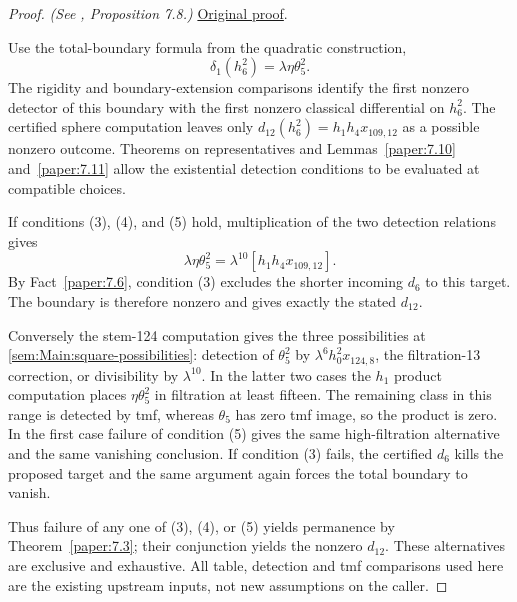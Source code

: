 \begin{proposition}

\end{proposition}
\begin{proof}
\textit{(See \cite{LWX126}, Proposition 7.8.)} \href{paper/main.tex.html#L2300}{Original proof}.

Use the total-boundary formula from the quadratic construction,
\[
 \delta_1(h_6^2)=\lambda\eta\theta_5^2.
\]
The rigidity and boundary-extension comparisons identify the first nonzero detector of this boundary with the first nonzero classical differential on $h_6^2$. The certified sphere computation leaves only $d_{12}(h_6^2)=h_1h_4x_{109,12}$ as a possible nonzero outcome. Theorems on representatives and Lemmas~\ref{paper:7.10} and~\ref{paper:7.11} allow the existential detection conditions to be evaluated at compatible choices.

If conditions (3), (4), and (5) hold, multiplication of the two detection relations gives
\[
 \lambda\eta\theta_5^2=\lambda^{10}[h_1h_4x_{109,12}].
\]
By Fact~\ref{paper:7.6}, condition (3) excludes the shorter incoming $d_6$ to this target. The boundary is therefore nonzero and gives exactly the stated $d_{12}$.

Conversely the stem-124 computation gives the three possibilities at \ref{sem:Main:square-possibilities}: detection of $\theta_5^2$ by $\lambda^6h_0^2x_{124,8}$, the filtration-13 correction, or divisibility by $\lambda^{10}$. In the latter two cases the $h_1$ product computation places $\eta\theta_5^2$ in filtration at least fifteen. The remaining class in this range is detected by tmf, whereas $\theta_5$ has zero tmf image, so the product is zero. In the first case failure of condition (5) gives the same high-filtration alternative and the same vanishing conclusion. If condition (3) fails, the certified $d_6$ kills the proposed target and the same argument again forces the total boundary to vanish.

Thus failure of any one of (3), (4), or (5) yields permanence by Theorem~\ref{paper:7.3}; their conjunction yields the nonzero $d_{12}$. These alternatives are exclusive and exhaustive. All table, detection and tmf comparisons used here are the existing upstream inputs, not new assumptions on the caller.
\end{proof}

